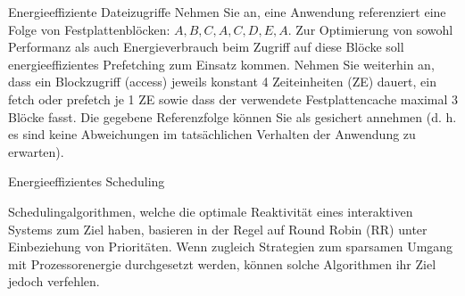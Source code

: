 \documentclass[10pt, a4paper]{exam}
\begin{document}
\begin{questions}
  \question Energieeffiziente Dateizugriffe
  Nehmen Sie an, eine Anwendung referenziert eine Folge von Festplattenblöcken: $A,B,C,A,C,D,E,A$.
  Zur Optimierung von sowohl Performanz als auch Energieverbrauch beim Zugriff auf diese Blöcke soll energieeffizientes Prefetching zum Einsatz kommen. Nehmen Sie weiterhin an, dass ein Blockzugriff (access) jeweils konstant 4 Zeiteinheiten (ZE) dauert, ein fetch oder prefetch je 1 ZE sowie dass der verwendete Festplattencache maximal 3 Blöcke fasst. Die gegebene Referenzfolge können Sie als gesichert annehmen (d. h. es sind keine Abweichungen im tatsächlichen Verhalten der Anwendung zu erwarten).

  \question Energieeffizientes Scheduling

  Schedulingalgorithmen, welche die optimale Reaktivität eines interaktiven Systems zum Ziel haben, basieren in der Regel auf Round Robin (RR) unter Einbeziehung von Prioritäten. Wenn zugleich Strategien zum sparsamen Umgang mit Prozessorenergie durchgesetzt werden, können solche Algorithmen ihr Ziel jedoch verfehlen.
\end{questions}
\end{document}
